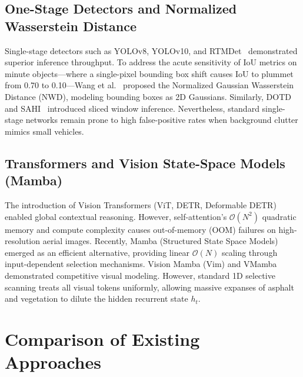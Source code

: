 \documentclass[12pt,a4paper]{report}
\begin{document}
\subsection{One-Stage Detectors and Normalized Wasserstein Distance}
Single-stage detectors such as YOLOv8, YOLOv10, and RTMDet~\cite{lyu2022rtmdet} demonstrated superior inference throughput. To address the acute sensitivity of IoU metrics on minute objects—where a single-pixel bounding box shift causes IoU to plummet from 0.70 to 0.10—Wang et al.~\cite{wang2021nwd} proposed the Normalized Gaussian Wasserstein Distance (NWD), modeling bounding boxes as 2D Gaussians. Similarly, DOTD~\cite{xu2021dotd} and SAHI~\cite{akyron2022sahi} introduced sliced window inference. Nevertheless, standard single-stage networks remain prone to high false-positive rates when background clutter mimics small vehicles.

\subsection{Transformers and Vision State-Space Models (Mamba)}
The introduction of Vision Transformers (ViT, DETR, Deformable DETR) enabled global contextual reasoning. However, self-attention's $\mathcal{O}(N^2)$ quadratic memory and compute complexity causes out-of-memory (OOM) failures on high-resolution aerial images. Recently, Mamba (Structured State Space Models)~\cite{gu2023mamba} emerged as an efficient alternative, providing linear $\mathcal{O}(N)$ scaling through input-dependent selection mechanisms. Vision Mamba (Vim) and VMamba~\cite{liu2024vmamba} demonstrated competitive visual modeling. However, standard 1D selective scanning treats all visual tokens uniformly, allowing massive expanses of asphalt and vegetation to dilute the hidden recurrent state $h_t$.

\section{Comparison of Existing Approaches}
\end{document}
